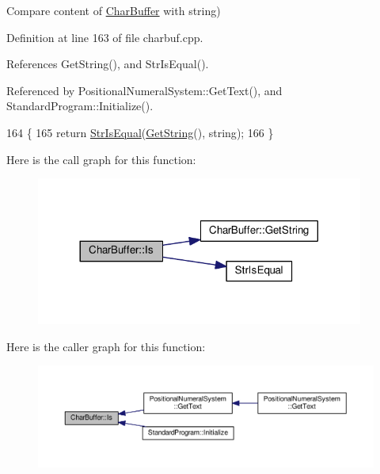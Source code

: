 Compare content of \hyperlink{classCharBuffer}{Char\+Buffer} with string) 



Definition at line 163 of file charbuf.\+cpp.



References Get\+String(), and Str\+Is\+Equal().



Referenced by Positional\+Numeral\+System\+::\+Get\+Text(), and Standard\+Program\+::\+Initialize().


\begin{DoxyCode}
164 \{
165     \textcolor{keywordflow}{return} \hyperlink{clib_8h_a2a1f39d11cbbaac992d42e67557dac4b}{StrIsEqual}(\hyperlink{classCharBuffer_a7dfd3feaaf80f318ba44efe15b1ec44b}{GetString}(), \textcolor{keywordtype}{string});
166 \}
\end{DoxyCode}


Here is the call graph for this function\+:\nopagebreak
\begin{figure}[H]
\begin{center}
\leavevmode
\includegraphics[width=305pt]{classCharBuffer_a64988275bda43dddb6d2b3b9551cefb0_cgraph}
\end{center}
\end{figure}




Here is the caller graph for this function\+:\nopagebreak
\begin{figure}[H]
\begin{center}
\leavevmode
\includegraphics[width=350pt]{classCharBuffer_a64988275bda43dddb6d2b3b9551cefb0_icgraph}
\end{center}
\end{figure}



